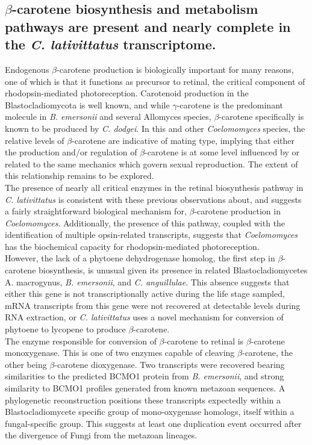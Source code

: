 \subsection*{$\beta$-carotene biosynthesis and metabolism pathways are present and nearly complete in the \textit{C. lativittatus} transcriptome.}
Endogenous $\beta$-carotene production is biologically important for many reasons, one of which is that it functions as precursor to retinal, the critical component of rhodopsin-mediated photoreception. Carotenoid production in the Blastocladiomycota is well known, and while $\gamma$-carotene is the predominant molecule in \textit{B. emersonii} and several Allomyces species, $\beta$-carotene specifically is known to be produced by \textit{C. dodgei}. In this and other \textit{Coelomomyces} species, the relative levels of $\beta$-carotene are indicative of mating type, implying that either the production and/or regulation of $\beta$-carotene is at some level influenced by or related to the same mechanics which govern sexual reproduction. The extent of this relationship remains to be explored. \\
\indent The presence of nearly all critical enzymes in the retinal biosynthesis pathway in \textit{C. lativittatus} is consistent with these previous observations about, and suggests a fairly straightforward biological mechanism for, $\beta$-carotene production in \textit{Coelomomyces}. Additionally, the presence of this pathway, coupled with the identification of multiple opsin-related transcripts, suggests that \textit{Coelomomyces} has the biochemical capacity for rhodopsin-mediated photoreception. \\
\indent However, the lack of a phytoene dehydrogenase homolog, the first step in $\beta$-carotene biosynthesis, is unusual given its presence in related Blastocladiomycetes A. macrogynus, \textit{B. emersonii}, and \textit{C. anguillulae}. This absence suggests that either this gene is not transcriptionally active during the life stage sampled, mRNA transcripts from this gene were not recovered at detectable levels during RNA extraction, or \textit{C. lativittatus} uses a novel mechanism for conversion of phytoene to lycopene to produce $\beta$-carotene. \\
\indent The enzyme responsible for conversion of $\beta$-carotene to retinal is $\beta$-carotene monoxygenase. This is one of two enzymes capable of cleaving $\beta$-carotene, the other being $\beta$-carotene dioxygenase. Two transcripts were recovered bearing similarities to the predicted BCMO1 protein from \textit{B. emersonii}, and strong similarity to BCMO1 profiles generated from known metazoan sequences. A phylogenetic reconstruction positions these transcripts expectedly within a Blastocladiomycete specific group of mono-oxygenase homologs, itself within a fungal-specific group. This suggests at least one duplication event occurred after the divergence of Fungi from the metazoan lineages. \\

